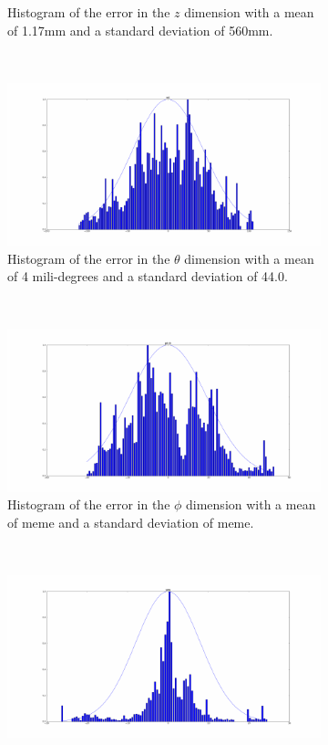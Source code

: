 \begin{figure}
\begin{subfigure}{0.45\textwidth}
     \caption{Histogram of the error in the $z$ dimension with a mean of 1.17mm and a standard deviation of 560mm.}
  \label{fig:norm-z}
  \end{subfigure}
~
  \begin{subfigure}{0.45\textwidth}
     \includegraphics[width=\textwidth]{figures/chapter3/norm_roll.pdf}
     \caption{Histogram of the error in the $\theta$ dimension with a mean of 4 mili-degrees and a standard deviation of 44.0\degree.}
  \label{fig:norm-roll}
  \end{subfigure}
~
  \begin{subfigure}{0.45\textwidth}
     \includegraphics[width=\textwidth]{figures/chapter3/norm_pitch.pdf}
     \caption{Histogram of the error in the $\phi$ dimension with a mean of meme and a standard deviation of meme.}
  \label{fig:norm-pitch}
  \end{subfigure}
~
  \begin{subfigure}{0.45\textwidth}
     \includegraphics[width=\textwidth]{figures/chapter3/norm_yaw.pdf}

\end{subfigure}
\end{figure}
